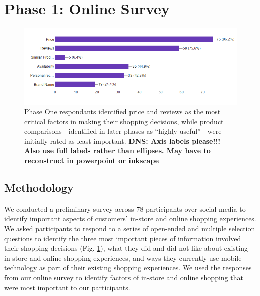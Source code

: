 \section{Phase 1: Online Survey}

\begin{figure}
	\includegraphics[width=0.9\columnwidth]{figures/ShoppingFactors}
	\caption{Phase One respondants identified price and reviews as the most critical factors in making their shopping decisions, while product comparisons---identified in later phases as ``highly useful''---were initially rated as least important. \textbf{DNS: Axis labels please!!! Also use full labels rather than ellipses. May have to reconstruct in powerpoint or inkscape}}
	\label{figures:ShoppingFactors}
\end{figure}

 \subsection{Methodology}
We conducted a preliminary survey across 78 participants over social media to identify important aspects of customers' in-store and online shopping experiences. We asked participants to respond to a series of open-ended and multiple selection questions to identify the three most important pieces of information involved their shopping decisions (Fig. \ref{figures:ShoppingFactors}), what they did and did not like about existing in-store and online shopping experiences, and ways they currently use mobile technology as part of their existing shopping experiences. 
We used the responses from our online survey to
identify 
factors of in-store and online shopping that were most important to our participants.  

